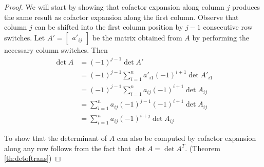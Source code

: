 \documentclass{ximera}
\begin{document}
\begin{proof}
We will start by showing that cofactor expansion along column $j$ produces the same result as cofactor expansion along the first column.  Observe that column $j$ can be shifted into the first column position by $j-1$ consecutive row switches.  Let $A'=\begin{bmatrix}a'_{ij}\end{bmatrix}$ be the matrix obtained from $A$ by performing the necessary column switches.  Then 
\begin{align*}
\det{A}&=(-1)^{j-1}\det{A'}\\
&=(-1)^{j-1}\sum_{i=1}^na'_{i1}(-1)^{i+1}\det{A'_{i1}}\\
&=(-1)^{j-1}\sum_{i=1}^na_{ij}(-1)^{i+1}\det{A_{ij}}\\
&=\sum_{i=1}^na_{ij}(-1)^{j-1}(-1)^{i+1}\det{A_{ij}}\\
&=\sum_{i=1}^na_{ij}(-1)^{i+j}\det{A_{ij}}
\end{align*}

To show that the determinant of $A$ can also be computed by cofactor expansion along any row follows from the fact that $\det{A}=\det{A^T}$. (Theorem \ref{th:detoftrans})
\end{proof}
\end{document}
